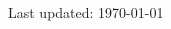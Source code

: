 \documentclass[10pt, a4paper]{article}
\begin{document}
\begin{thebibliography}{599}




\end{thebibliography}

\vfill{}
\hrulefill

\begin{center}
{\footnotesize Last updated: \today}
\end{center}
\end{document}
